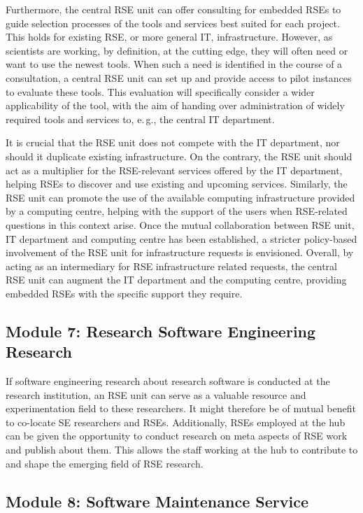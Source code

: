 \documentclass[a4paper]{article}
\makeatletter
\newcommand*{\eg}{e.\,g.\@\xspace}
\makeatother
\begin{document}
Furthermore, the central RSE unit can offer consulting for embedded RSEs to guide selection processes of the tools and services best suited for each project.
This holds for existing RSE, or more general IT, infrastructure.
However, as scientists are working, by definition, at the cutting edge, they will often need or want to use the newest tools.
When such a need is identified in the course of a consultation, a central RSE unit can set up and provide access to pilot instances to evaluate these tools.
This evaluation will specifically consider a wider applicability of the tool, with the aim of handing over administration of widely required tools and services to, \eg{}, the central IT department.

It is crucial that the RSE unit does not compete with the IT department, nor should it duplicate existing infrastructure.
On the contrary, the RSE unit should act as a multiplier for the RSE-relevant services offered by the IT department, helping RSEs to discover and use existing and upcoming services.
Similarly, the RSE unit can promote the use of the available computing infrastructure provided by a computing centre, helping with the support of the users when RSE-related questions in this context arise.
Once the mutual collaboration between RSE unit, IT department and computing centre has been established, a stricter policy-based involvement of the RSE unit for infrastructure requests is envisioned.
Overall, by acting as an intermediary for RSE infrastructure related requests, the central RSE unit can augment the IT department and the computing centre, providing embedded RSEs with the specific support they require.

\subsection{Module 7: Research Software Engineering Research}%
\label{sec:rseresearch}

If software engineering research about research software is conducted at the research institution, an RSE unit can serve as a valuable resource and experimentation field to these researchers.
It might therefore be of mutual benefit to co-locate SE researchers and RSEs.
Additionally, RSEs employed at the hub can be given the opportunity to conduct research on meta aspects of RSE work and publish about them.
This allows the staff working at the hub to contribute to and shape the emerging field of RSE research.

\subsection{Module 8: Software Maintenance Service}%
\label{sec:maintenance}
\end{document}
